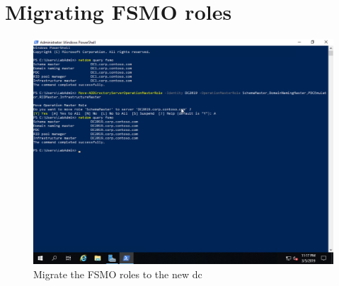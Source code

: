\section{Migrating FSMO roles}
\begin{figure}[!htb]
		\captionsetup{width=0.8\linewidth}
		\includegraphics[width=0.9\linewidth]{img/Methodologie/Migration23.png} 
		\centering	
		\caption[FSMO migration]{Migrate the FSMO roles to the new \acrshort{dc}}
		\label{fig:FSMO}
\end{figure}
\clearpage
